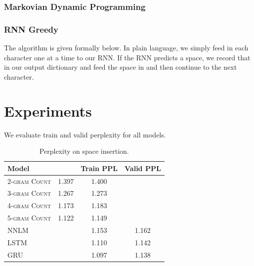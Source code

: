 \documentclass[11pt]{article}
\begin{document}
\subsubsection{Markovian Dynamic Programming}

\subsubsection{RNN Greedy}

The algorithm is given formally below. In plain language, we simply feed in each character one at a time to our RNN. If the RNN predicts a space, we record that in our output dictionary and feed the space in and then continue to the next character. 

\begin{algorithmic}
      \EndIf{}
      \EndIf{}
    \EndWhile{}
  \EndProcedure{}
\end{algorithmic}

\section{Experiments}

We evaluate train and valid perplexity for all models.

\begin{table}[h]
\centering
\begin{tabular}{llcc}
 \toprule
 Model &  & Train PPL & Valid PPL \\
 \midrule
 \textsc{2-gram Count} & 1.397 & 1.400 \\
 \textsc{3-gram Count} & 1.267 & 1.273 \\
 \textsc{4-gram Count} & 1.173 & 1.183  \\
 \textsc{5-gram Count} & 1.122 & 1.149 \\
 \textsc{NNLM} & & 1.153 & 1.162 \\
 \textsc{LSTM} & & 1.110 & 1.142 \\
 \textsc{GRU} &  & 1.097 & 1.138 \\
 \bottomrule
\end{tabular}
\caption{\label{tab:results} Perplexity on space insertion.}
\end{table}
\end{document}
